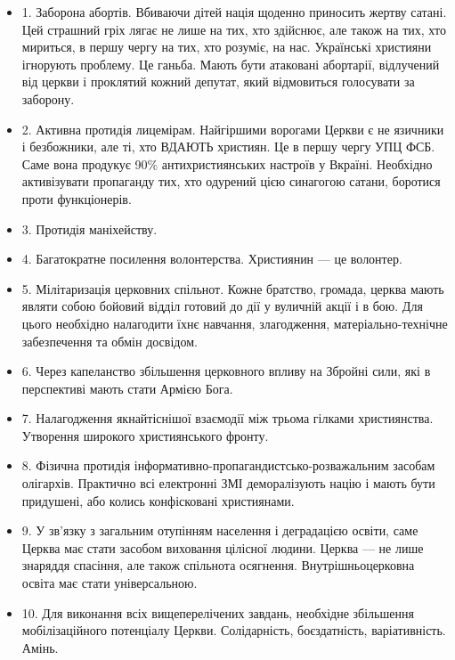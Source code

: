 \begin{itemize}
\item 1. Заборона абортів. Вбиваючи дітей нація щоденно приносить жертву
				сатані. Цей страшний гріх лягає не лише на тих, хто здійснює, але також
				на тих, хто мириться, в першу чергу на тих, хто розуміє, на нас.
				Українські християни ігнорують проблему. Це ганьба.  Мають бути
				атаковані абортарії, відлучений від церкви і проклятий кожний депутат,
				який відмовиться голосувати за заборону.

\item 2. Активна протидія лицемірам. Найгіршими ворогами Церкви є не язичники і
				безбожники, але ті, хто ВДАЮТЬ християн. Це в першу чергу УПЦ ФСБ. Саме
				вона продукує 90\% антихристиянських настроїв у Вкраїні. Необхідно
				активізувати пропаганду тих, хто одурений цією синагогою сатани,
				боротися проти функціонерів.

\item 3. Протидія маніхейству.

\item 4. Багатократне посилення волонтерства. Християнин --- це волонтер.

\item 5. Мілітаризація церковних спільнот. Кожне братство, громада, церква
				мають являти собою бойовий відділ готовий до дії у вуличній акції і в
				бою. Для цього необхідно налагодити їхнє навчання, злагодження,
				матеріально-технічне забезпечення та обмін досвідом.

\item 6. Через капеланство збільшення церковного впливу на Збройні сили, які в
				перспективі мають стати Армією Бога.

\item 7. Налагодження якнайтіснішої взаємодії між трьома гілками християнства.
				Утворення широкого християнського фронту.

\item 8. Фізична протидія інформативно-пропагандистсько-розважальним засобам
				олігархів. Практично всі електронні ЗМІ деморалізують націю і мають
				бути придушені, або колись конфісковані християнами.

\item 9. У зв’язку з загальним отупінням населення і деградацією освіти, саме
				Церква має стати засобом виховання цілісної людини. Церква --- не лише
				знаряддя спасіння, але також спільнота осягнення. Внутрішньоцерковна
				освіта має стати універсальною.

\item 10. Для виконання всіх вищеперелічених завдань, необхідне збільшення
				мобілізаційного потенціалу Церкви. Солідарність, боєздатність,
				варіативність. Амінь.
\end{itemize}
